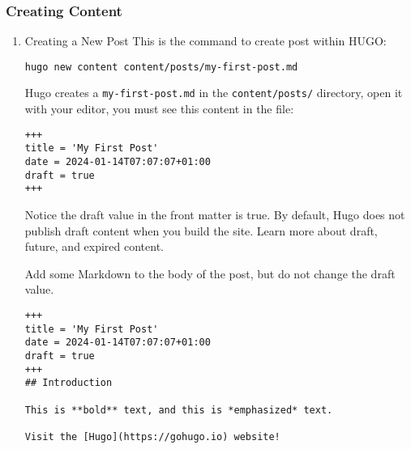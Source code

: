 \documentclass[11pt]{article}
\begin{document}
\subsubsection{Creating Content}
\label{sec:org33f857f}
\begin{enumerate}
\item Creating a New Post
\label{sec:orge02d3e4}
This is the command to create post within HUGO:

\begin{verbatim}
hugo new content content/posts/my-first-post.md
\end{verbatim}

Hugo creates a \texttt{my-first-post.md} in the \texttt{content/posts/} directory, open it with your editor, you must see this content in the file:

\begin{verbatim}
+++
title = 'My First Post'
date = 2024-01-14T07:07:07+01:00
draft = true
+++
\end{verbatim}

Notice the draft value in the front matter is true. By default, Hugo does not publish draft content when you build the site. Learn more about draft, future, and expired content.

Add some Markdown to the body of the post, but do not change the draft value.

\begin{verbatim}
+++
title = 'My First Post'
date = 2024-01-14T07:07:07+01:00
draft = true
+++
## Introduction

This is **bold** text, and this is *emphasized* text.

Visit the [Hugo](https://gohugo.io) website!
\end{verbatim}
\end{enumerate}
\end{document}

